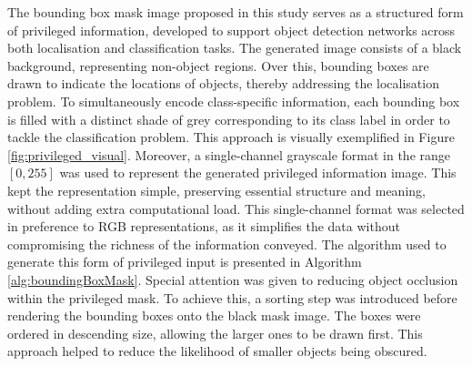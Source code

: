 The bounding box mask image proposed in this study serves as a structured form of privileged information, developed to support object detection networks across both localisation and classification tasks. The generated image consists of a black background, representing non-object regions. Over this, bounding boxes are drawn to indicate the locations of objects, thereby addressing the localisation problem. To simultaneously encode class-specific information, each bounding box is filled with a distinct shade of grey corresponding to its class label in order to tackle the classification problem. This approach is visually exemplified in Figure \ref{fig:privileged_visual}.
Moreover, a single-channel grayscale format in the range $[0, 255]$ was used to represent the generated privileged information image. This kept the representation simple, preserving essential structure and meaning, without adding extra computational load. This single-channel format was selected in preference to RGB representations, as it simplifies the data without compromising the richness of the information conveyed. The algorithm used to generate this form of privileged input is presented in Algorithm \ref{alg:boundingBoxMask}. Special attention was given to reducing object occlusion within the privileged mask. To achieve this, a sorting step was introduced before rendering the bounding boxes onto the black mask image. The boxes were ordered in descending size, allowing the larger ones to be drawn first. This approach helped to reduce the likelihood of smaller objects being obscured.

        
        
